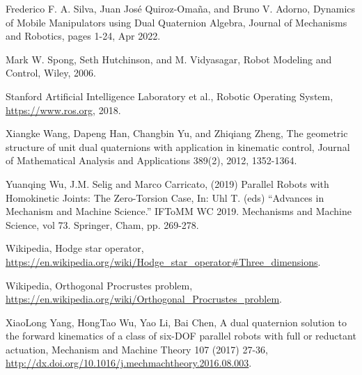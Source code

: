 \documentclass[reqno,12pt]{amsart}
\begin{document}
\begin{thebibliography}{99}
 Frederico F. A. Silva, Juan Jos\'e Quiroz-Oma\~na, and Bruno V. Adorno, Dynamics of Mobile Manipulators using Dual Quaternion Algebra, Journal of Mechanisms and Robotics, pages 1-24, Apr 2022.

 Mark W. Spong, Seth Hutchinson, and M. Vidyasagar, Robot Modeling and Control, Wiley, 2006.

 Stanford Artificial Intelligence Laboratory et al., Robotic Operating System, \url{https://www.ros.org}, 2018.

 Xiangke Wang, Dapeng Han, Changbin Yu, and Zhiqiang Zheng, The geometric structure of unit dual quaternions with application in kinematic control, Journal of Mathematical Analysis and Applications 389(2), 2012, 1352-1364.

 Yuanqing Wu, J.M. Selig and Marco Carricato,  (2019) Parallel
Robots with Homokinetic Joints: The Zero-Torsion Case, In: Uhl T. (eds) ``Advances in Mechanism and Machine Science.'' IFToMM WC 2019. Mechanisms and Machine Science, vol 73. Springer, Cham, pp. 269-278.

 Wikipedia, Hodge star operator, \url{https://en.wikipedia.org/wiki/Hodge_star_operator#Three_dimensions}.

 Wikipedia, Orthogonal Procrustes problem, \url{https://en.wikipedia.org/wiki/Orthogonal_Procrustes_problem}.

 XiaoLong Yang, HongTao Wu, Yao Li, Bai Chen, A dual quaternion solution to the forward kinematics of a class of six-DOF parallel robots with full or reductant actuation, Mechanism and Machine Theory 107 (2017) 27-36, \url{http://dx.doi.org/10.1016/j.mechmachtheory.2016.08.003}.

\end{thebibliography}
\end{document}
